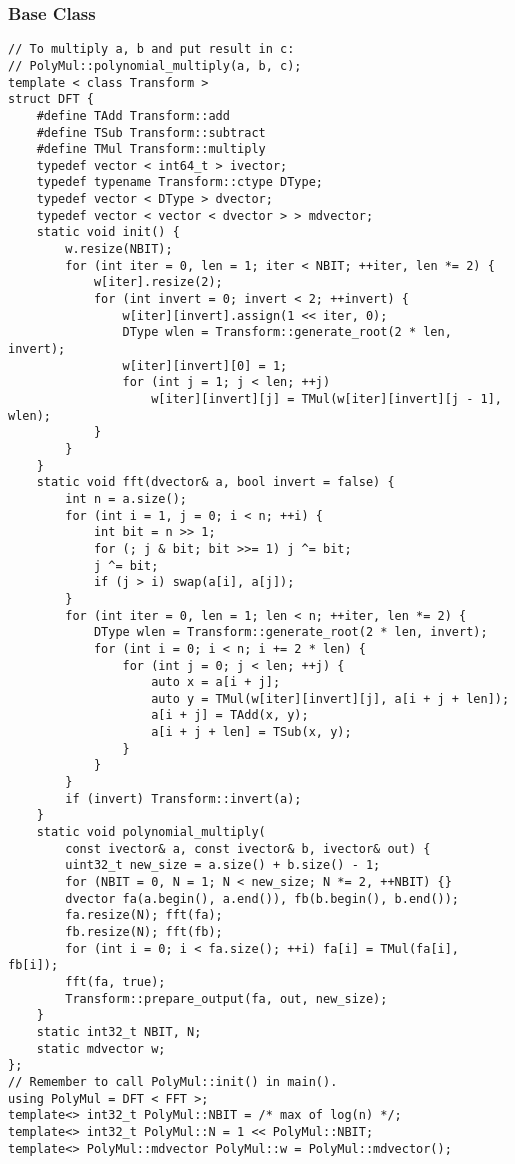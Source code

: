 \documentclass[10pt,landscape]{article}
\begin{document}
\begin{multicols}{2}
\subsubsection{Base Class}
\begin{lstlisting}
// To multiply a, b and put result in c:
// PolyMul::polynomial_multiply(a, b, c);
template < class Transform >
struct DFT {
    #define TAdd Transform::add
    #define TSub Transform::subtract
    #define TMul Transform::multiply
    typedef vector < int64_t > ivector;
    typedef typename Transform::ctype DType;
    typedef vector < DType > dvector;
    typedef vector < vector < dvector > > mdvector;
    static void init() {
        w.resize(NBIT);
        for (int iter = 0, len = 1; iter < NBIT; ++iter, len *= 2) {
            w[iter].resize(2);
            for (int invert = 0; invert < 2; ++invert) {
                w[iter][invert].assign(1 << iter, 0);
                DType wlen = Transform::generate_root(2 * len, invert);
                w[iter][invert][0] = 1;
                for (int j = 1; j < len; ++j)
                    w[iter][invert][j] = TMul(w[iter][invert][j - 1], wlen);
            }
        }
    }
    static void fft(dvector& a, bool invert = false) {
        int n = a.size();
        for (int i = 1, j = 0; i < n; ++i) {
            int bit = n >> 1; 
            for (; j & bit; bit >>= 1) j ^= bit;
            j ^= bit;
            if (j > i) swap(a[i], a[j]);
        }
        for (int iter = 0, len = 1; len < n; ++iter, len *= 2) {
            DType wlen = Transform::generate_root(2 * len, invert);
            for (int i = 0; i < n; i += 2 * len) {
                for (int j = 0; j < len; ++j) {
                    auto x = a[i + j];
                    auto y = TMul(w[iter][invert][j], a[i + j + len]);
                    a[i + j] = TAdd(x, y);
                    a[i + j + len] = TSub(x, y);
                }
            }
        }
        if (invert) Transform::invert(a);
    }
    static void polynomial_multiply(
        const ivector& a, const ivector& b, ivector& out) {
        uint32_t new_size = a.size() + b.size() - 1;
        for (NBIT = 0, N = 1; N < new_size; N *= 2, ++NBIT) {}
        dvector fa(a.begin(), a.end()), fb(b.begin(), b.end());
        fa.resize(N); fft(fa);
        fb.resize(N); fft(fb);
        for (int i = 0; i < fa.size(); ++i) fa[i] = TMul(fa[i], fb[i]);
        fft(fa, true);
        Transform::prepare_output(fa, out, new_size);
    }
    static int32_t NBIT, N;
    static mdvector w;
};
// Remember to call PolyMul::init() in main().
using PolyMul = DFT < FFT >;
template<> int32_t PolyMul::NBIT = /* max of log(n) */;
template<> int32_t PolyMul::N = 1 << PolyMul::NBIT;
template<> PolyMul::mdvector PolyMul::w = PolyMul::mdvector();
\end{lstlisting}

\end{multicols}
\end{document}
